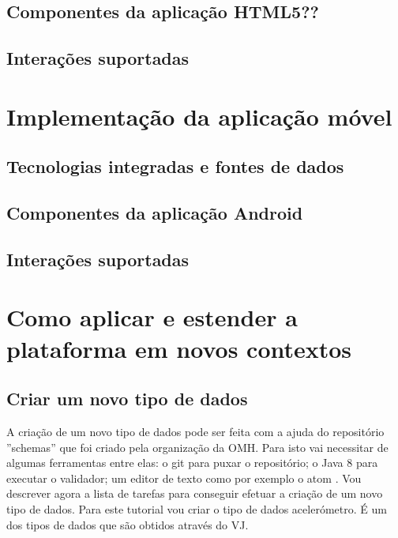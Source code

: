 \subsection{Componentes da aplicação HTML5??}

\subsection{Interações suportadas }


\section{Implementação da aplicação móvel}
\subsection{Tecnologias integradas e fontes de dados}
\subsection{Componentes da aplicação Android}
\subsection{Interações suportadas }




\section{Como aplicar e estender a plataforma em novos contextos}


\subsection{Criar um novo tipo de dados}

A criação de um novo tipo de dados pode ser feita com a ajuda do repositório ''schemas'' \cite{schemas-rep} que foi criado pela organização da \gls{OMH}. Para isto vai necessitar de algumas ferramentas entre elas: o git \cite{git-install} para puxar o repositório; o Java 8 \cite{java-overview} para executar o validador; um editor de texto como por exemplo o atom \cite{atom-install}. Vou descrever agora a lista de tarefas para conseguir efetuar a criação de um novo tipo de dados. Para este tutorial vou criar o tipo de dados acelerómetro. É um dos tipos de dados que são obtidos através do \gls{VJ}.

